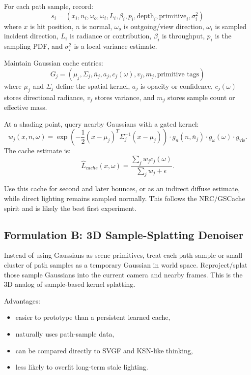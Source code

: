 \documentclass[11pt]{article}
\begin{document}
For each path sample, record:
\[
  s_i = (x_i, n_i, \omega_o, \omega_i, L_i, \beta_i, p_i,
        \text{depth}_i, \text{primitive}_i, \sigma_i^2)
\]
where $x$ is hit position, $n$ is normal, $\omega_o$ is outgoing/view direction,
$\omega_i$ is sampled incident direction, $L_i$ is radiance or contribution,
$\beta_i$ is throughput, $p_i$ is the sampling PDF, and $\sigma_i^2$ is a local
variance estimate.

Maintain Gaussian cache entries:
\[
  G_j =
  (\mu_j, \Sigma_j, \bar{n}_j, a_j, c_j(\omega), v_j, m_j,
   \text{primitive tags})
\]
where $\mu_j$ and $\Sigma_j$ define the spatial kernel, $a_j$ is opacity or
confidence, $c_j(\omega)$ stores directional radiance, $v_j$ stores variance,
and $m_j$ stores sample count or effective mass.

At a shading point, query nearby Gaussians with a gated kernel:
\[
  w_j(x,n,\omega) =
  \exp\left(-\frac{1}{2}(x-\mu_j)^T\Sigma_j^{-1}(x-\mu_j)\right)
  \cdot g_n(n,\bar{n}_j)
  \cdot g_\omega(\omega)
  \cdot g_{\text{vis}}.
\]
The cache estimate is:
\[
  \hat{L}_{cache}(x,\omega) =
  \frac{\sum_j w_j c_j(\omega)}
       {\sum_j w_j + \epsilon}.
\]

Use this cache for second and later bounces, or as an indirect diffuse estimate,
while direct lighting remains sampled normally. This follows the NRC/GSCache
spirit and is likely the best first experiment.

\subsection{Formulation B: 3D Sample-Splatting Denoiser}

Instead of using Gaussians as scene primitives, treat each path sample or small
cluster of path samples as a temporary Gaussian in world space. Reproject/splat
those sample Gaussians into the current camera and nearby frames. This is the
3D analog of sample-based kernel splatting.

Advantages:

\begin{itemize}
  \item easier to prototype than a persistent learned cache,
  \item naturally uses path-sample data,
  \item can be compared directly to SVGF and KSN-like thinking,
  \item less likely to overfit long-term stale lighting.
\end{itemize}
\end{document}

